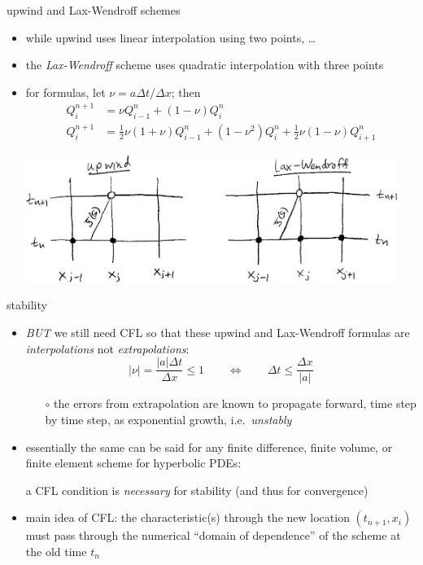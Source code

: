 \documentclass[10pt,hyperref]{beamer}
\begin{document}
\begin{frame}{upwind and Lax-Wendroff schemes}

\begin{itemize}
\item while upwind uses linear interpolation using two points, \dots
\item the \emph{Lax-Wendroff} scheme uses quadratic interpolation with three points
\item for formulas, let $\nu = a\Delta t/\Delta x$; then
\begin{align*}
Q_i^{n+1} &= \nu Q_{i-1}^n + \left(1 - \nu\right) Q_i^n \\
Q_i^{n+1} &= \tfrac{1}{2} \nu (1+\nu) Q_{i-1}^n + \left(1 - \nu^2\right) Q_i^n + \tfrac{1}{2} \nu (1-\nu) Q_{i+1}^n
\end{align*}

\begin{center}
\includegraphics[width=0.95\textwidth]{figs/stencilssketch}
\end{center}
\end{itemize}
\end{frame}


\begin{frame}{stability}

\begin{itemize}
\item \emph{BUT} we still need CFL so that these upwind and Lax-Wendroff formulas are \emph{interpolations} not \emph{extrapolations}:
    $$|\nu| = \frac{|a|\Delta t}{\Delta x} \le 1 \qquad \iff \qquad \Delta t \le \frac{\Delta x}{|a|}$$

    \begin{itemize}
    \item[$\circ$] the errors from extrapolation are known to propagate forward, time step by time step, as exponential growth, i.e.~\emph{unstably}
    \end{itemize}
\item essentially the same can be said for any finite difference, finite volume, or finite element scheme for hyperbolic PDEs:

\begin{center}
a CFL condition is \emph{necessary} for stability (and thus for convergence)
\end{center}

\item \alert{main idea of CFL:} the characteristic(s) through the new location $(t_{n+1},x_i)$ must pass through the numerical ``domain of dependence'' of the scheme at the old time $t_n$
\end{itemize}
\end{frame}
\end{document}
